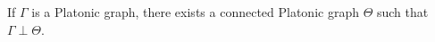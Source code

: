 If $\Gamma$ is a Platonic graph, there exists a connected Platonic graph $\Theta$ such that $\Gamma \perp \Theta$.
